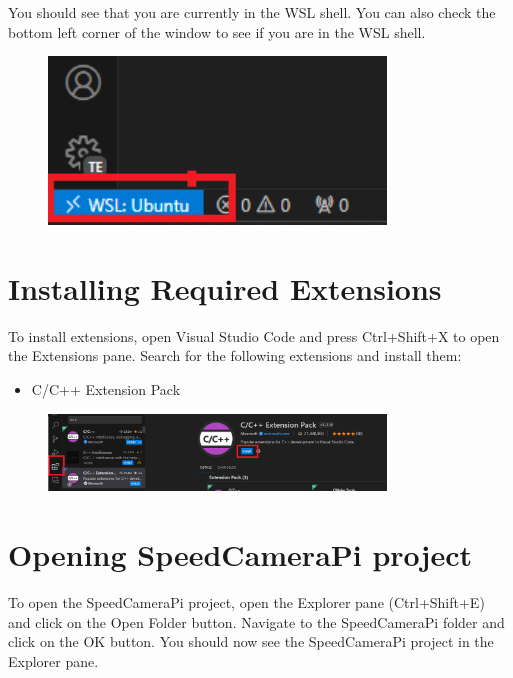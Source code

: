 You should see that you are currently in the WSL shell. You can also check the bottom left corner of the window to see if you are in the WSL shell.

\begin{figure}[H]
      \centering
      \includegraphics[width=0.8\textwidth]{texs/chapter1/image/wslconnect2.png}
\end{figure}

\section{Installing Required Extensions}

To install extensions, open Visual Studio Code and press Ctrl+Shift+X to open the Extensions pane. Search for the following extensions and install them:

\begin{itemize}
      \item C/C++ Extension Pack
\end{itemize}

\begin{figure}[H]
      \centering
      \includegraphics[width=0.8\textwidth]{texs/chapter1/image/c++ext.png}
\end{figure}

\section{Opening SpeedCameraPi project}

To open the SpeedCameraPi project, open the Explorer pane (Ctrl+Shift+E) and click on the Open Folder button. Navigate to the SpeedCameraPi folder and click on the OK button. You should now see the SpeedCameraPi project in the Explorer pane.

